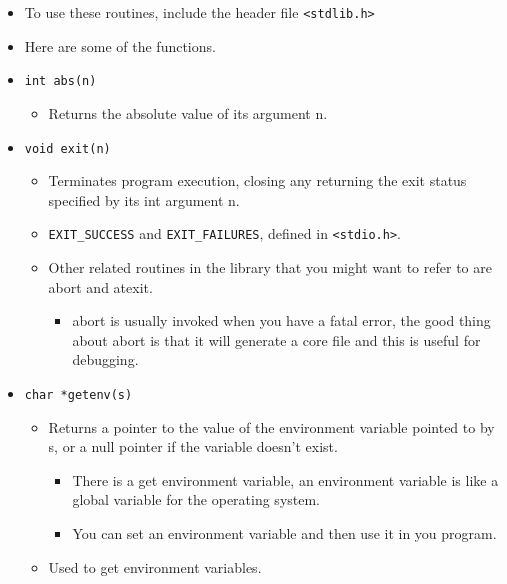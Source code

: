 \begin{itemize}
    \item To use these routines, include the header file \verb|<stdlib.h>|
    \item Here are some of the functions.
    \item \texttt{int abs(n)}
        \begin{itemize}
            \item Returns the absolute value of its argument n.
        \end{itemize}
    
    \item \texttt{void exit(n)}
        \begin{itemize}
            \item Terminates program execution, closing any returning the exit status specified by its int argument n.
            \item \verb|EXIT_SUCCESS| and \verb|EXIT_FAILURES|, defined in \verb|<stdio.h>|.
            \item Other related routines in the library that you might want to refer to are abort and atexit.
                \begin{itemize}
                    \item abort is usually invoked when you have a fatal error, the good thing about abort is that it will generate a core file and this is useful for debugging.
                \end{itemize}
        \end{itemize}
    
    \item \texttt{char *getenv(s)}
        \begin{itemize}
            \item Returns a pointer to the value of the environment variable pointed to by s, or a null pointer if the variable doesn't exist.
                \begin{itemize}
                    \item There is a get environment variable, an environment variable is like a global variable for the operating system.
                    \item You can set an environment variable and then use it in you program.
                \end{itemize}
            
            \item Used to get environment variables.
        \end{itemize}
    

\end{itemize}
